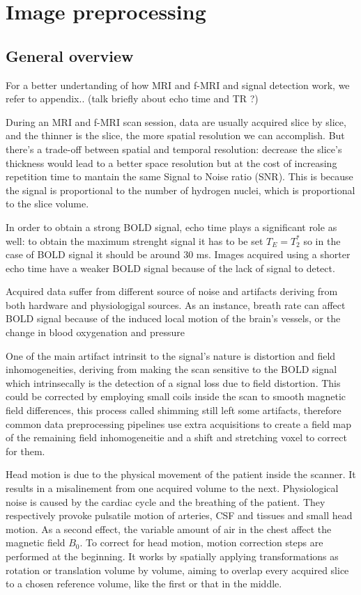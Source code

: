 \documentclass[a4paper,11pt]{article}
\begin{document}
\section{Image preprocessing}
\subsection{General overview}
For a better undertanding of how MRI and f-MRI and signal detection work, we refer to appendix..
(talk briefly about echo time and TR ?)

During an MRI and f-MRI scan session, data are usually acquired slice by slice, and the thinner is the slice, the more spatial resolution we can accomplish.
But there's a trade-off between spatial and temporal resolution: decrease the slice's thickness would lead to a better space resolution but at the cost of increasing repetition time to mantain the same Signal to Noise ratio (SNR).
This is because the signal is proportional to the number of hydrogen nuclei, which is proportional to the slice volume.

In order to obtain a strong BOLD signal, echo time plays a significant role as well: to obtain the maximum strenght signal it has to be set $T_E = T_2^{\ast}$ so in the case of BOLD signal it should be around 30 ms.
Images acquired using a shorter echo time have a weaker BOLD signal because of the lack of signal to detect. \cite{Triantafyllou2011}

Acquired data suffer from different source of noise and artifacts deriving from both hardware and physiologigal sources.
As an instance, breath rate can affect BOLD signal because of the induced local motion of the brain's vessels, or the change in blood oxygenation and pressure

One of the main artifact intrinsit to the signal's nature is distortion and field inhomogeneities, deriving from making the scan sensitive to the BOLD signal which intrinsecally is the detection of a signal loss due to field distortion.
This could be corrected by employing small coils inside the scan to smooth magnetic field differences, this process called shimming still left some artifacts, therefore common data preprocessing pipelines use extra acquisitions to create a field map of the remaining field inhomogeneitie and a shift and stretching voxel to correct for them.

Head motion is due to the physical movement of the patient inside the scanner. It results in a misalinement from one acquired volume to the next.
Physiological noise is caused by the cardiac cycle and the breathing of the patient. They respectively provoke pulsatile motion of arteries, CSF and tissues and small head motion. As a second effect, the variable amount of air in the chest affect the magnetic field $B_0$.
To correct for head motion, motion correction steps are performed at the beginning. It works by spatially applying transformations as rotation or translation volume by volume, aiming to overlap every acquired slice to a chosen reference volume, like the first or that in the middle.
\end{document}
